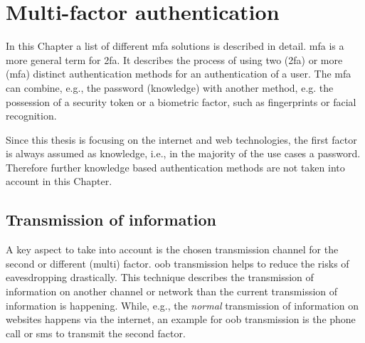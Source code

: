 \chapter{Multi-factor authentication}

In this Chapter a list of different \gls{mfa} solutions is described in detail. \Gls{mfa} is a more general term for \gls{2fa}. It describes the process of using two (\gls{2fa}) or more (\gls{mfa}) distinct authentication methods for an authentication of a user. The \gls{mfa} can combine, e.g., the password (knowledge) with another method, e.g. the possession of a security token or a biometric factor, such as fingerprints or facial recognition.

Since this thesis is focusing on the internet and web technologies, the first factor is always assumed as knowledge, i.e., in the majority of the use cases a password. Therefore further knowledge based authentication methods are not taken into account in this Chapter.


\section{Transmission of information}

A key aspect to take into account is the chosen transmission channel for the second or different (multi) factor. \gls{oob} transmission helps to reduce the risks of eavesdropping drastically. This technique describes the transmission of information on another channel or network than the current transmission of information is happening. While, e.g., the \textit{normal} transmission of information on websites happens via the internet, an example for \gls{oob} transmission is the phone call or \gls{sms} to transmit the second factor. 